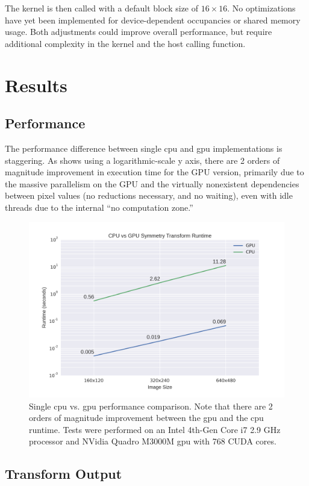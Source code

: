 The kernel is then called with a default block size of \(16\times16\). No optimizations have yet been implemented for device-dependent occupancies or shared memory usage. Both adjustments could improve overall performance, but require additional complexity in the kernel and the host calling function. 

\section{Results}
\label{sec:results}
\subsection{Performance}
\label{sec:performance}

The performance difference between single \gls{cpu} and \gls{gpu} implementations is staggering. As  shows using a logarithmic-scale y axis, there are 2 orders of magnitude improvement in execution time for the GPU version, primarily due to the massive parallelism on the GPU and the virtually nonexistent dependencies between pixel values (\ie no reductions necessary, and no waiting), even with idle threads due to the internal ``no computation zone.''

\begin{figure}[htbp]
\centering
\includegraphics[width=0.6\linewidth]{figures/cpu_v_gpu.png}
\caption[Single CPU vs GPU performance comparison.]{\label{fig:perf}
Single \gls{cpu} vs. \gls{gpu} performance comparison. Note that there are 2 orders of magnitude improvement between the \gls{gpu} and the \gls{cpu} runtime. Tests were performed on an Intel 4th-Gen Core i7 2.9 GHz processor and NVidia Quadro M3000M \gls{gpu} with 768 CUDA cores.}
\end{figure}

\subsection{Transform Output}
\label{sec:transform-output}


